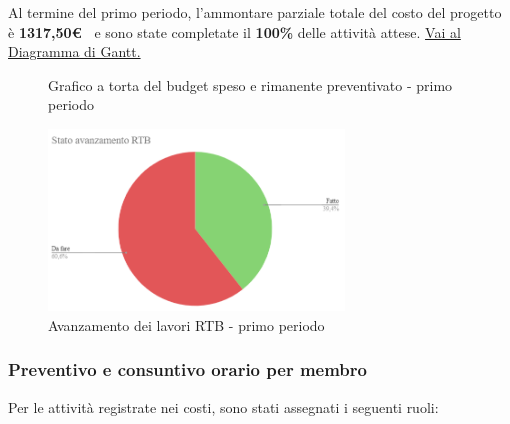 Al termine del primo periodo, l'ammontare parziale totale del costo del progetto è \textbf{ 1317,50\euro\ } e sono state completate il \textbf{100\%} delle attività attese.
\href{https://github.com/orgs/ByteOps-swe/projects/3/views/1?sortedBy%5Bdirection%5D=asc&sortedBy%5BcolumnId%5D=64182560}{Vai al Diagramma di Gantt.}
\hspace{1pt}
  \begin{figure}[H]
    \centering
    \begin{minipage}[b]{0.45\textwidth}
        \centering
        \caption{Grafico a torta del budget speso e rimanente preventivato - primo periodo}
        \label{fig:Budget_speso_1}
    \end{minipage}
    
    \vspace{1cm}

    \begin{minipage}[b]{0.70\textwidth}
        \centering
        \includegraphics[width=0.7\textwidth]{../Images/avanzamento1Periodo.png}
        \caption{Avanzamento dei lavori RTB - primo periodo}
        \label{fig:Avanzamento_RTB_1}
    \end{minipage}
\end{figure}

\subsubsection*{Preventivo e consuntivo orario per membro}
Per le attività registrate nei costi, sono stati assegnati i seguenti ruoli: 

